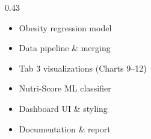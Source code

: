 \documentclass[aspectratio=169, 10pt]{beamer}
\begin{document}
\begin{frame}
\begin{columns}[T]
\begin{column}{0.43\textwidth}
\begin{tcolorbox}[gbox, title={\footnotesize\bfseries Nguyen Thi Tra My},
      coltitle=white, colbacktitle=NGreen]
\begin{itemize}
        \item Obesity regression model
        \item Data pipeline \& merging
      \end{itemize}
    \end{tcolorbox}
    \vspace{2pt}
    \begin{tcolorbox}[obox, title={\footnotesize\bfseries Tran Thi Hoai Phuong},
      coltitle=white, colbacktitle=NOrange]
      \footnotesize
      \begin{itemize}\setlength\itemsep{0pt}
        \item Tab 3 visualizations (Charts 9--12)
        \item Nutri-Score ML classifier
        \item Dashboard UI \& styling
        \item Documentation \& report
      \end{itemize}
    \end{tcolorbox}
  \end{column}
\end{columns}
\end{frame}
\end{document}
